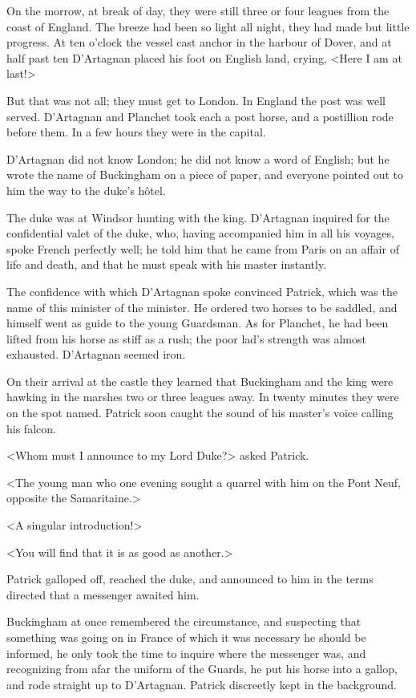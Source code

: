 On the morrow, at break of day, they were still three or four leagues from the coast of England. The breeze had been so light all night, they had made but little progress. At ten o'clock the vessel cast anchor in the harbour of Dover, and at half past ten D'Artagnan placed his foot on English land, crying, <Here I am at last!> 

But that was not all; they must get to London. In England the post was well served. D'Artagnan and Planchet took each a post horse, and a postillion rode before them. In a few hours they were in the capital. 

D'Artagnan did not know London; he did not know a word of English; but he wrote the name of Buckingham on a piece of paper, and everyone pointed out to him the way to the duke's hôtel. 

The duke was at Windsor hunting with the king. D'Artagnan inquired for the confidential valet of the duke, who, having accompanied him in all his voyages, spoke French perfectly well; he told him that he came from Paris on an affair of life and death, and that he must speak with his master instantly. 

The confidence with which D'Artagnan spoke convinced Patrick, which was the name of this minister of the minister. He ordered two horses to be saddled, and himself went as guide to the young Guardsman. As for Planchet, he had been lifted from his horse as stiff as a rush; the poor lad's strength was almost exhausted. D'Artagnan seemed iron. 

On their arrival at the castle they learned that Buckingham and the king were hawking in the marshes two or three leagues away. In twenty minutes they were on the spot named. Patrick soon caught the sound of his master's voice calling his falcon. 

<Whom must I announce to my Lord Duke?> asked Patrick. 

<The young man who one evening sought a quarrel with him on the Pont Neuf, opposite the Samaritaine.> 

<A singular introduction!> 

<You will find that it is as good as another.> 

Patrick galloped off, reached the duke, and announced to him in the terms directed that a messenger awaited him. 

Buckingham at once remembered the circumstance, and suspecting that something was going on in France of which it was necessary he should be informed, he only took the time to inquire where the messenger was, and recognizing from afar the uniform of the Guards, he put his horse into a gallop, and rode straight up to D'Artagnan. Patrick discreetly kept in the background. 


